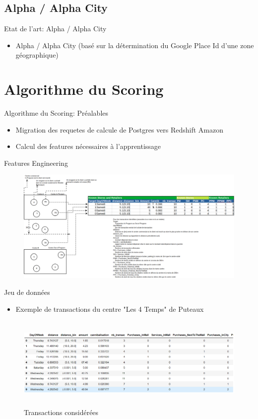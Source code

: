 \documentclass{beamer}
\begin{document}
\subsection{Alpha / Alpha City}
\begin{frame}{Etat de l'art: Alpha / Alpha City}
\begin{itemize}
		\item Alpha / Alpha City (basé sur la détermination du Google Place Id d'une zone géographique)
\end{itemize}
\end{frame} 

\section{Algorithme du Scoring}
\begin{frame}{Algorithme du Scoring: Préalables}
\begin{itemize}
		\item Migration des requetes de calcule de Postgres vers Redshift Amazon
		\item Calcul des features nécessaires à l'apprentissage
\end{itemize}
\end{frame}
\begin{frame}{Features Engineering }
\begin{figure}[H]
    \includegraphics[width=11.5cm,height=5.5cm]{images/Building_scoring_2.png}
    \label{fig:L1}
\end{figure}
\end{frame}
\begin{frame}{Jeu de données}
\begin{itemize}
		\item Exemple de transactions du centre "Les 4 Temps" de Puteaux
\end{itemize}
\begin{figure}[H]
    \includegraphics[width=12cm,height=4.5cm]{images/data_1.png}
    \caption{ Transactions considérées}
    \label{fig:L1}
\end{figure}
\end{frame}
\end{document}
